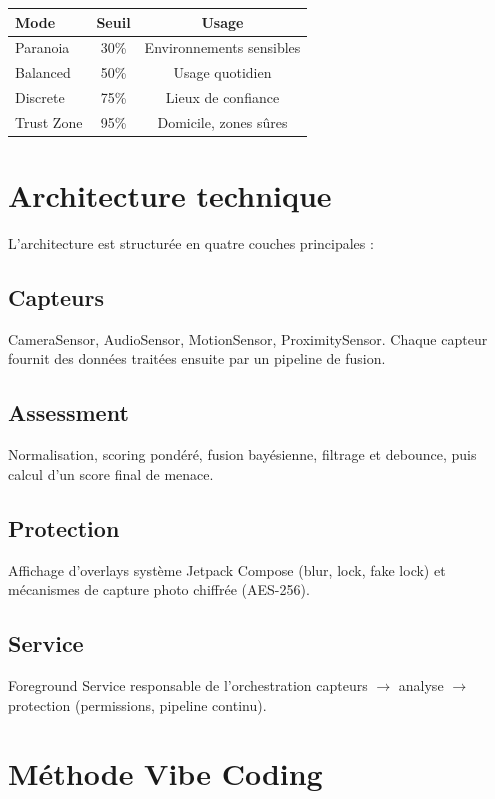\documentclass[11pt,a4paper]{article}
\begin{document}
\begin{center}
\begin{tabular}{lcc}
\toprule
\textbf{Mode} & \textbf{Seuil} & \textbf{Usage}\\
\midrule
Paranoia & 30\% & Environnements sensibles\\
Balanced & 50\% & Usage quotidien\\
Discrete & 75\% & Lieux de confiance\\
Trust Zone & 95\% & Domicile, zones sûres\\
\bottomrule
\end{tabular}
\end{center}

\section{Architecture technique}

L'architecture est structurée en quatre couches principales :

\subsection{Capteurs}
CameraSensor, AudioSensor, MotionSensor, ProximitySensor. 
Chaque capteur fournit des données traitées ensuite par un pipeline de fusion.

\subsection{Assessment}
Normalisation, scoring pondéré, fusion bayésienne, filtrage et debounce, puis calcul d'un score final de menace.

\subsection{Protection}
Affichage d'overlays système Jetpack Compose (blur, lock, fake lock) et mécanismes de capture photo chiffrée (AES-256).

\subsection{Service}
Foreground Service responsable de l'orchestration capteurs $\rightarrow$ analyse $\rightarrow$ protection (permissions, pipeline continu).




\section{Méthode Vibe Coding}
\end{document}
